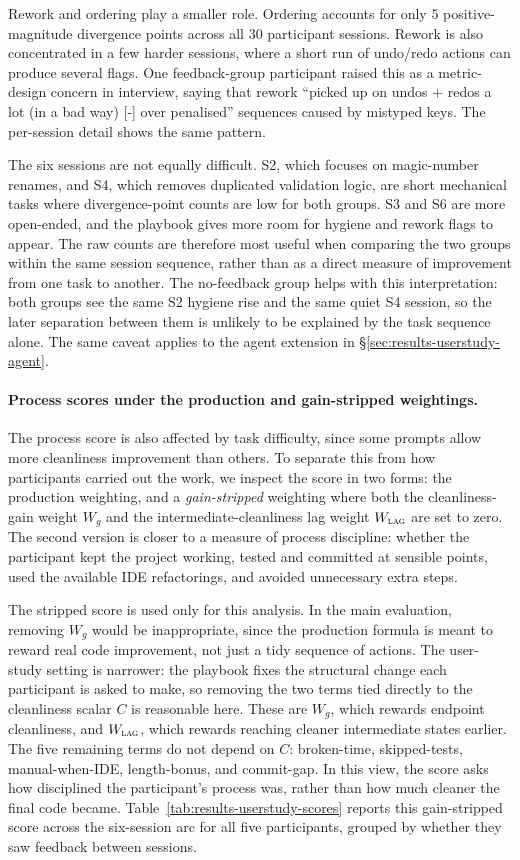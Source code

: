 Rework and ordering play a smaller role. Ordering accounts for only $5$ positive-magnitude divergence points across all $30$ participant sessions. Rework is also concentrated in a few harder sessions, where a short run of undo/redo actions can produce several flags. One feedback-group participant raised this as a metric-design concern in interview, saying that rework ``picked up on undos + redos a lot (in a bad way) [-] over penalised'' sequences caused by mistyped keys. The per-session detail shows the same pattern.

The six sessions are not equally difficult. S2, which focuses on magic-number renames, and S4, which removes duplicated validation logic, are short mechanical tasks where divergence-point counts are low for both groups. S3 and S6 are more open-ended, and the playbook gives more room for hygiene and rework flags to appear. The raw counts are therefore most useful when comparing the two groups within the same session sequence, rather than as a direct measure of improvement from one task to another. The no-feedback group helps with this interpretation: both groups see the same S2 hygiene rise and the same quiet S4 session, so the later separation between them is unlikely to be explained by the task sequence alone. The same caveat applies to the agent extension in \S\ref{sec:results-userstudy-agent}.

\paragraph{Process scores under the production and gain-stripped weightings.}
The process score is also affected by task difficulty, since some prompts allow more cleanliness improvement than others. To separate this from how participants carried out the work, we inspect the score in two forms: the production weighting, and a \emph{gain-stripped} weighting where both the cleanliness-gain weight $W_g$ and the intermediate-cleanliness lag weight $W_{\textsc{lag}}$ are set to zero. The second version is closer to a measure of process discipline: whether the participant kept the project working, tested and committed at sensible points, used the available IDE refactorings, and avoided unnecessary extra steps.

The stripped score is used only for this analysis. In the main evaluation, removing $W_g$ would be inappropriate, since the production formula is meant to reward real code improvement, not just a tidy sequence of actions. The user-study setting is narrower: the playbook fixes the structural change each participant is asked to make, so removing the two terms tied directly to the cleanliness scalar $C$ is reasonable here. These are $W_g$, which rewards endpoint cleanliness, and $W_{\textsc{lag}}$, which rewards reaching cleaner intermediate states earlier. The five remaining terms do not depend on $C$: broken-time, skipped-tests, manual-when-IDE, length-bonus, and commit-gap. In this view, the score asks how disciplined the participant's process was, rather than how much cleaner the final code became. Table~\ref{tab:results-userstudy-scores} reports this gain-stripped score across the six-session arc for all five participants, grouped by whether they saw feedback between sessions.

